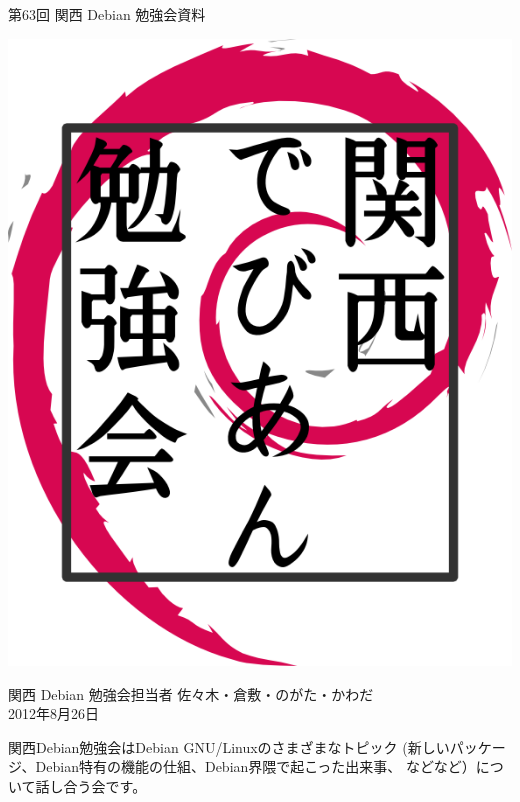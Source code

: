 \documentclass[mingoth,a4paper]{jsarticle}
\newcommand{\debmtgyear}{2012}
\newcommand{\debmtgdate}{26}
\newcommand{\debmtgmonth}{8}
\newcommand{\debmtgnumber}{63}
\begin{document}
\begin{titlepage}


 第\debmtgnumber{}回 関西 Debian 勉強会資料

\vspace{2cm}

\begin{center}
\includegraphics{image200802/kansaidebianlogo.png}
\end{center}

\begin{flushright}
\hfill{}関西 Debian 勉強会担当者 佐々木・倉敷・のがた・かわだ \\
\hfill{}\debmtgyear{}年\debmtgmonth{}月\debmtgdate{}日
\end{flushright}

\thispagestyle{empty}
\end{titlepage}


 関西Debian勉強会はDebian GNU/Linuxのさまざまなトピック
 (新しいパッケージ、Debian特有の機能の仕組、Debian界隈で起こった出来事、
 などなど）について話し合う会です。
\end{document}
